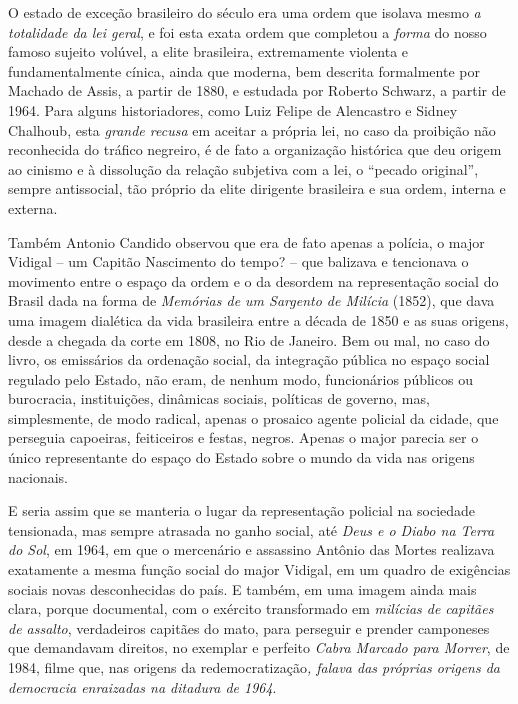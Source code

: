 O estado de exceção brasileiro do século  era uma ordem que isolava
mesmo \emph{a totalidade da lei geral}, e foi esta exata ordem que
completou a \emph{forma} do nosso famoso sujeito volúvel, a elite
brasileira, extremamente violenta e fundamentalmente cínica, ainda que
moderna, bem descrita formalmente por Machado de Assis, a partir de
1880, e estudada por Roberto Schwarz, a partir de 1964. Para alguns
historiadores, como Luiz Felipe de Alencastro e Sidney Chalhoub, esta
\emph{grande recusa} em aceitar a própria lei, no caso da proibição não
reconhecida do tráfico negreiro, é de fato a organização histórica que
deu origem ao cinismo e à dissolução da relação subjetiva com a lei, o
``pecado original'', sempre antissocial, tão próprio da elite dirigente
brasileira e sua ordem, interna e externa.

Também Antonio Candido observou que era de fato apenas a polícia, o
major Vidigal -- um Capitão Nascimento do tempo? -- que balizava e
tencionava o movimento entre o espaço da ordem e o da desordem na
representação social do Brasil dada na forma de \emph{Memórias de um
Sargento de Milícia} (1852), que dava uma imagem dialética da vida
brasileira entre a década de 1850 e as suas origens, desde a chegada da
corte em 1808, no Rio de Janeiro. Bem ou mal, no caso do livro, os
emissários da ordenação social, da integração pública no espaço social
regulado pelo Estado, não eram, de nenhum modo, funcionários públicos ou
burocracia, instituições, dinâmicas sociais, políticas de governo, mas,
simplesmente, de modo radical, apenas o prosaico agente policial da
cidade, que perseguia capoeiras, feiticeiros e festas, negros. Apenas o
major parecia ser o único representante do espaço do Estado sobre o
mundo da vida nas origens nacionais.

E seria assim que se manteria o lugar da representação policial na
sociedade tensionada, mas sempre atrasada no ganho social, até
\emph{Deus e o Diabo na Terra do Sol}, em 1964, em que o mercenário e
assassino Antônio das Mortes realizava exatamente a mesma função social
do major Vidigal, em um quadro de exigências sociais novas desconhecidas
do país. E também, em uma imagem ainda mais clara, porque documental,
com o exército transformado em \emph{milícias de} \emph{capitães de
assalto}, verdadeiros capitães do mato, para perseguir e prender
camponeses que demandavam direitos, no exemplar e perfeito \emph{Cabra
Marcado para Morrer}, de 1984, filme que, nas origens da
redemocratização\emph{, falava das próprias origens da democracia
enraizadas na ditadura de 1964}.


